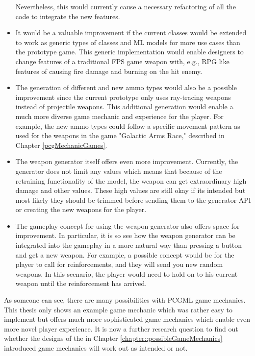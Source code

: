 \documentclass[MGS,Master,english]{twbook}%
\newcommand{\FHTWCitationType}{HARVARD} %
\begin{document}
\begin{itemize}
	Nevertheless, this would currently cause a necessary refactoring of all the code to integrate the new features.
	\item It would be a valuable improvement if the current classes would be extended to work as generic types of classes and \ac{ML} models for more use cases than the prototype game. This generic implementation would enable designers to change features of a traditional \ac{FPS} game weapon with, e.g., \ac{RPG} like features of causing fire damage and burning on the hit enemy.
	\item The generation of different and new ammo types would also be a possible improvement since the current prototype only uses ray-tracing weapons instead of projectile weapons. This additional generation would enable a much more diverse game mechanic and experience for the player. For example, the new ammo types could follow a specific movement pattern as used for the weapons in the game "Galactic Arms Race," described in Chapter \ref{pcgMechanicGames}.
	\item The weapon generator itself offers even more improvement. Currently, the generator does not limit any values which means that because of the retraining functionality of the model, the weapon can get extraordinary high damage and other values. These high values are still okay if its intended but most likely they should be trimmed before sending them to the generator \ac{API} or creating the new weapons for the player.
	\item The gameplay concept for using the weapon generator also offers space for improvement. In particular, it is so see how the weapon generator can be integrated into the gameplay in a more natural way than pressing a button and get a new weapon. For example, a possible concept would be for the player to call for reinforcements, and they will send you new random weapons. In this scenario, the player would need to hold on to his current weapon until the reinforcement has arrived.
\end{itemize}
As someone can see, there are many possibilities with \ac{PCGML} game mechanics. This thesis only shows an example game mechanic which was rather easy to implement but offers much more sophisticated game mechanics which enable even more novel player experience. It is now a further research question to find out whether the designs of the in Chapter \ref{chapter::possibleGameMechanics} introduced game mechanics will work out as intended or not.

%
%
\clearpage
\ifthenelse{\equal{\FHTWCitationType}{HARVARD}}{}{}

\clearpage
\end{document}
